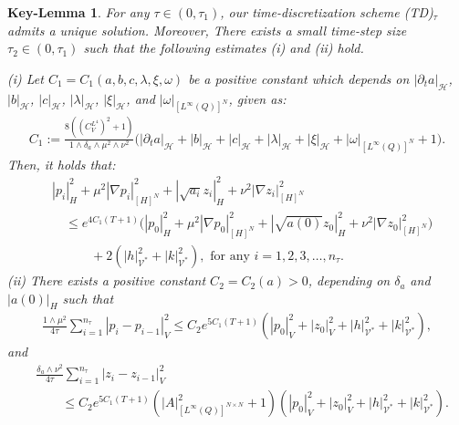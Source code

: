 \documentclass{sinst}
\numberwithin{equation}{section}
\theoremstyle{plain}
\newtheorem{keylem}{Key-Lemma}
\theoremstyle{definition}
\def\sH{\mathscr{H}}
\def\sV{\mathscr{V}}
\begin{document}
\begin{keylem} \label{lem:P_est}
  For any $\tau \in (0,\tau_1)$, our time-discretization scheme (TD)$_\tau$ admits a unique solution. Moreover, There exists a small time-step size $\tau_2 \in (0,\tau_1)$ such that the following estimates (i) and (ii) hold.
  
  \smallskip
  \noindent
  (i) Let $C_1 = C_1(a,b,c,\lambda,\xi,\omega)$ be a positive constant which depends on $|\partial_t a|_\sH$, $|b|_\sH$, $|c|_\sH$, $|\lambda|_\sH$, $|\xi|_\sH$, and $|\omega|_{[L^\infty(Q)]^N}$, given as:
  \begin{gather}
    C_1 := \frac{8((C_V^{L^4})^2 + 1)}{1 \wedge \delta_a \wedge \mu^2 \wedge \nu^2}\bigl( |\partial_t a|_\sH + |b|_\sH + |c|_\sH + |\lambda|_\sH + |\xi|_\sH + |\omega|_{[L^\infty(Q)]^N} + 1\bigr).
  \end{gather}
  Then, it holds that:
  \begin{align}
    &|p_i|_H^2 + \mu^2 |\nabla p_i|_{[H]^N}^2 + |\sqrt{a_i}z_i|_H^2 + \nu^2 |\nabla z_i|_{[H]^N}^2 
    \\
    &\quad \leq e^{4 C_1 (T + 1)} \bigl( |p_0|_H^2 + \mu^2 |\nabla p_0|_{[H]^N}^2 + |\sqrt{a(0)}z_0|_H^2 + \nu^2 |\nabla z_0|_{[H]^N}^2 \bigr)
    \\
    &\quad\qquad + 2(|h|_{\sV^*}^2 + |k|_{\sV^*}^2), \mbox{ for any } i = 1,2,3,\dots, n_\tau. \label{P_TD_est1}
  \end{align}
  (ii) There exists a positive constant $C_2 = C_2(a) > 0$, depending on $\delta_a$ and $|a(0)|_H$ such that
  \begin{gather}
    \frac{1 \wedge \mu^2}{4\tau}\sum_{i=1}^{n_\tau} |p_i - p_{i-1}|_V^2 \leq C_2 e^{5C_1 (T + 1)} (|p_0|_V^2 + |z_0|_V^2 + |h|_{\sV^*}^2 + |k|_{\sV^*}^2), \label{P_TD_est2}
  \end{gather}
  and
  \begin{align}
    &\frac{\delta_a \wedge \nu^2}{4\tau}\sum_{i=1}^{n_\tau} |z_i - z_{i-1}|_V^2 
    \\
    &\qquad \leq C_2 e^{5 C_1 (T + 1)}(|A|_{[L^\infty(Q)]^{N \times N}}^2 + 1) (|p_0|_V^2 + |z_0|_V^2 + |h|_{\sV^*}^2 + |k|_{\sV^*}^2). \label{P_TD_est3}
  \end{align}
\end{keylem}
\end{document}
